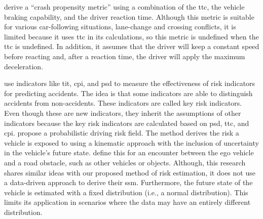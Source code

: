 \textcite{wang2014evaluation} derive a ``crash propensity metric'' using a combination of the \ac{ttc}, the vehicle braking capability, and the driver reaction time. 
Although this metric is suitable for various car-following situations, lane-change and crossing conflicts, it is limited because it uses \ac{ttc} in its calculations, so this metric is undefined when the \ac{ttc} is undefined. 
In addition, it assumes that the driver will keep a constant speed before reacting and, after a reaction  time, the driver will apply the maximum deceleration. \cendb


\textcite{shi2018key} use indicators like \ac{tit}, \ac{cpi}, and \ac{psd} to measure the effectiveness of risk indicators for predicting accidents. 
The idea is that some indicators are able to distinguish accidents from non-accidents. 
These indicators are called key risk indicators. 
\cstartb Even though these are new indicators, they inherit the assumptions of other indicators because the key risk indicators are calculated based on \ac{psd}, \ac{ttc}, and \ac{cpi}. \cendb
\textcite{mullakkal2020probabilistic} propose a probabilistic driving risk field.
The method derives the risk a vehicle is exposed to using a kinematic approach with the inclusion of uncertainty in the vehicle's future state. 
\textcite{mullakkal2020probabilistic} define this for an encounter between the ego vehicle and a road obstacle, such as other vehicles or objects. 
\cstartb Although, this research shares similar ideas with our proposed method of risk estimation, it does not use a data-driven approach to derive their \ac{ssm}. 
Furthermore, the future state of the vehicle is estimated with a fixed distribution (i.e., a normal distribution). 
This limits its application in scenarios where the data may have an entirely different distribution. \cendb

